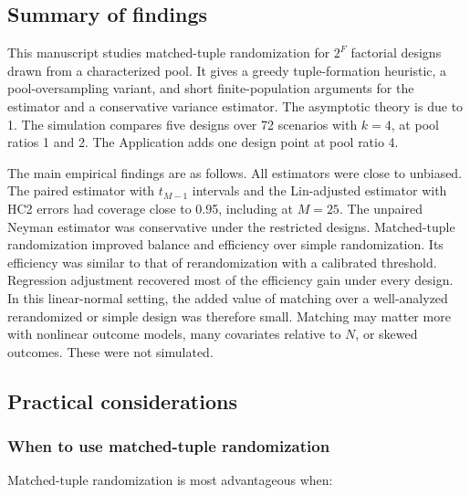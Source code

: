 \documentclass[
  11pt,
]{article}
\begin{document}
\subsection{Summary of findings}\label{summary-of-findings}

This manuscript studies matched-tuple randomization for
\(2^F\) factorial designs drawn from a characterized pool. It
gives a greedy tuple-formation heuristic, a
pool-oversampling variant, and short finite-population
arguments for the estimator and a conservative variance
estimator. The asymptotic theory is due to
1. The simulation compares five designs
over 72 scenarios with \(k = 4\), at pool ratios 1 and 2. The
Application adds one design point at pool ratio 4.

The main empirical findings are as follows. All estimators
were close to unbiased. The paired estimator with \(t_{M-1}\)
intervals and the Lin-adjusted estimator with HC2 errors
had coverage close to 0.95, including at \(M = 25\). The
unpaired Neyman estimator was conservative under the
restricted designs. Matched-tuple randomization improved
balance and efficiency over simple randomization. Its
efficiency was similar to that of rerandomization with a
calibrated threshold.
Regression adjustment recovered most of the efficiency gain
under every design. In this linear-normal setting, the
added value of matching over a well-analyzed
rerandomized or simple design was therefore small. Matching
may matter more with nonlinear outcome models, many
covariates relative to \(N\), or skewed outcomes. These were
not simulated.

\subsection{Practical considerations}\label{practical-considerations}

\subsubsection{When to use matched-tuple randomization}\label{when-to-use-matched-tuple-randomization}

Matched-tuple randomization is most advantageous when:
\end{document}
